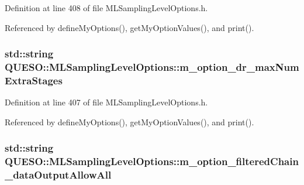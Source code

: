 Definition at line 408 of file M\-L\-Sampling\-Level\-Options.\-h.



Referenced by define\-My\-Options(), get\-My\-Option\-Values(), and print().

\hypertarget{class_q_u_e_s_o_1_1_m_l_sampling_level_options_a20e22ade885c548888ba633bc71b5ab2}{
\subsubsection[{m\-\_\-option\-\_\-dr\-\_\-max\-Num\-Extra\-Stages}]{\setlength{\rightskip}{0pt plus 5cm}std\-::string Q\-U\-E\-S\-O\-::\-M\-L\-Sampling\-Level\-Options\-::m\-\_\-option\-\_\-dr\-\_\-max\-Num\-Extra\-Stages\hspace{0.3cm}{\ttfamily [private]}}}\label{class_q_u_e_s_o_1_1_m_l_sampling_level_options_a20e22ade885c548888ba633bc71b5ab2}


Definition at line 407 of file M\-L\-Sampling\-Level\-Options.\-h.



Referenced by define\-My\-Options(), get\-My\-Option\-Values(), and print().

\hypertarget{class_q_u_e_s_o_1_1_m_l_sampling_level_options_a87338f130d6059b62643ad609f26bfb6}{
\subsubsection[{m\-\_\-option\-\_\-filtered\-Chain\-\_\-data\-Output\-Allow\-All}]{\setlength{\rightskip}{0pt plus 5cm}std\-::string Q\-U\-E\-S\-O\-::\-M\-L\-Sampling\-Level\-Options\-::m\-\_\-option\-\_\-filtered\-Chain\-\_\-data\-Output\-Allow\-All\hspace{0.3cm}{\ttfamily [private]}}}\label{class_q_u_e_s_o_1_1_m_l_sampling_level_options_a87338f130d6059b62643ad609f26bfb6}



